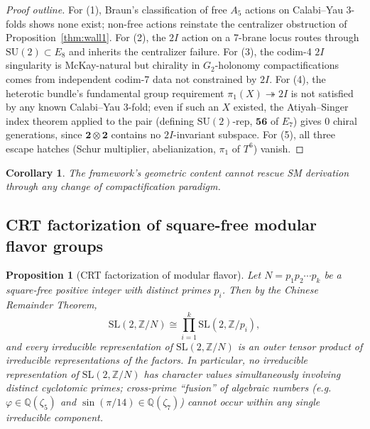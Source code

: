 \documentclass[11pt,a4paper]{amsart}
\newtheorem{proposition}[theorem]{Proposition}
\newtheorem{corollary}[theorem]{Corollary}
\theoremstyle{definition}
\theoremstyle{remark}
\newcommand{\SU}{\mathrm{SU}}
\newcommand{\SL}{\mathrm{SL}}
\newcommand{\bbZ}{\mathbb{Z}}
\newcommand{\bbQ}{\mathbb{Q}}
\begin{document}
\begin{proof}[Proof outline]
For (1), Braun's classification \cite{Braun2011} of free $A_5$ actions on
Calabi--Yau 3-folds shows none exist; non-free actions reinstate the centralizer
obstruction of Proposition~\ref{thm:wall1}. For (2), the $2I$ action on a 7-brane
locus routes through $\SU(2) \subset E_8$ and inherits the centralizer
failure. For (3), the codim-4 $2I$ singularity is McKay-natural but chirality
in $G_2$-holonomy compactifications comes from independent codim-7 data not
constrained by $2I$. For (4), the heterotic bundle's fundamental group requirement
$\pi_1(X) \twoheadrightarrow 2I$ is not satisfied by any known Calabi--Yau 3-fold;
even if such an $X$ existed, the Atiyah--Singer index theorem applied to
the pair (defining $\SU(2)$-rep, $\bm{56}$ of $E_7$) gives 0 chiral
generations, since $\bm{2} \otimes \bm{2}$ contains no $2I$-invariant subspace.
For (5), all three escape hatches (Schur multiplier, abelianization, $\pi_1$
of $T^6$) vanish.
\end{proof}

\begin{corollary}
The framework's geometric content cannot rescue SM derivation through any
change of compactification paradigm.
\end{corollary}

\subsection{CRT factorization of square-free modular flavor groups}

\begin{proposition}[CRT factorization of modular flavor]\label{thm:crt-modular}
Let $N = p_1 p_2 \cdots p_k$ be a square-free positive integer with distinct
primes $p_i$. Then by the Chinese Remainder Theorem,
\[ \SL(2,\bbZ/N) \cong \prod_{i=1}^k \SL(2,\bbZ/p_i), \]
and every irreducible representation of $\SL(2,\bbZ/N)$ is an outer tensor
product of irreducible representations of the factors. In particular, no
irreducible representation of $\SL(2,\bbZ/N)$ has character values
simultaneously involving distinct cyclotomic primes; cross-prime ``fusion''
of algebraic numbers (e.g.\ $\varphi \in \bbQ(\zeta_5)$ and
$\sin(\pi/14) \in \bbQ(\zeta_7)$) cannot occur within any single irreducible
component.
\end{proposition}
\end{document}
